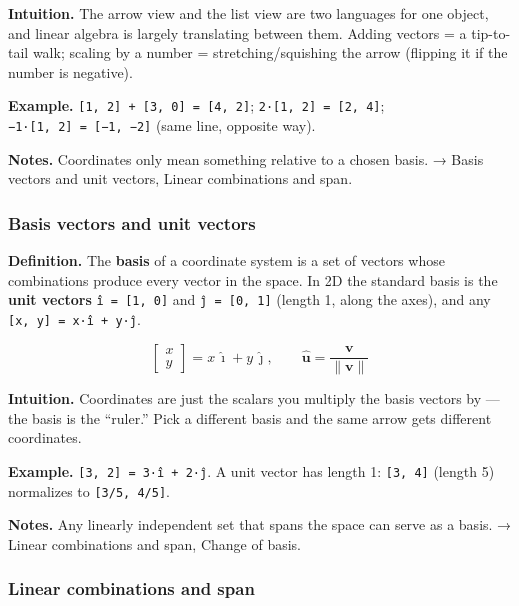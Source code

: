 \documentclass[
  10pt,
  letterpaper,
  onecolumn]{article}
\begin{document}
\textbf{Intuition.} The arrow view and the list view are two languages
for one object, and linear algebra is largely translating between them.
Adding vectors = a tip-to-tail walk; scaling by a number =
stretching/squishing the arrow (flipping it if the number is negative).

\textbf{Example.} \texttt{{[}1,\ 2{]}\ +\ {[}3,\ 0{]}\ =\ {[}4,\ 2{]}};
\texttt{2·{[}1,\ 2{]}\ =\ {[}2,\ 4{]}};
\texttt{−1·{[}1,\ 2{]}\ =\ {[}−1,\ −2{]}} (same line, opposite way).

\textbf{Notes.} Coordinates only mean something relative to a chosen
basis. → Basis vectors and unit vectors, Linear combinations and span.

\hypertarget{basis-vectors-and-unit-vectors}{%
\subsubsection{Basis vectors and unit
vectors}\label{basis-vectors-and-unit-vectors}}

\textbf{Definition.} The \textbf{basis} of a coordinate system is a set
of vectors whose combinations produce every vector in the space. In 2D
the standard basis is the \textbf{unit vectors}
\texttt{î\ =\ {[}1,\ 0{]}} and \texttt{ĵ\ =\ {[}0,\ 1{]}} (length 1,
along the axes), and any \texttt{{[}x,\ y{]}\ =\ x·î\ +\ y·ĵ}.

\begin{equation*}
\begin{bmatrix}x\\y\end{bmatrix}=x\,\hat{\imath}+y\,\hat{\jmath},
\qquad
\hat{\mathbf{u}}=\frac{\mathbf{v}}{\|\mathbf{v}\|}
\end{equation*}

\textbf{Intuition.} Coordinates are just the scalars you multiply the
basis vectors by --- the basis is the ``ruler.'' Pick a different basis
and the same arrow gets different coordinates.

\textbf{Example.} \texttt{{[}3,\ 2{]}\ =\ 3·î\ +\ 2·ĵ}. A unit vector
has length 1: \texttt{{[}3,\ 4{]}} (length 5) normalizes to
\texttt{{[}3/5,\ 4/5{]}}.

\textbf{Notes.} Any linearly independent set that spans the space can
serve as a basis. → Linear combinations and span, Change of basis.

\hypertarget{linear-combinations-and-span}{%
\subsubsection{Linear combinations and
span}\label{linear-combinations-and-span}}
\end{document}
